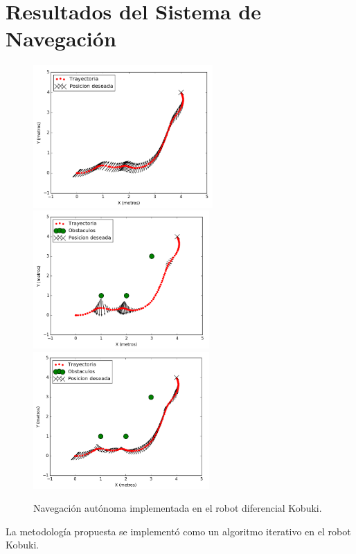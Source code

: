 \section{Resultados del Sistema de Navegación}
\begin{figure}%
  \centering \footnotesize
  \includegraphics[width=0.61\textwidth]{images/attr_kbki.png}
  \includegraphics[width=0.60\textwidth]{images/rep_kbki.png}
  \includegraphics[width=0.60\textwidth]{images/nav_kbki.png}
  \captionsetup{font=footnotesize}
  \caption{Navegación autónoma implementada en el robot diferencial Kobuki.}
  \label{f:kbki_APF}
\end{figure}
La metodología propuesta se implementó como un algoritmo iterativo en el robot Kobuki. 
